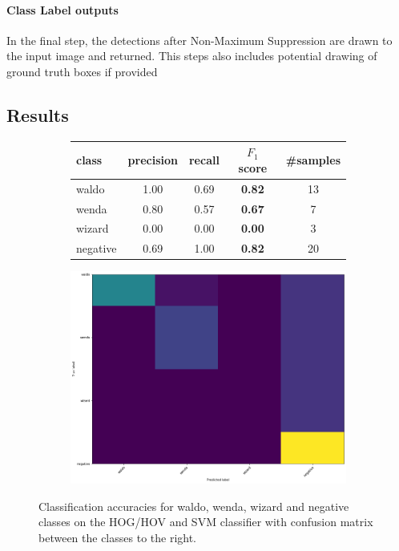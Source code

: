 \documentclass[11pt]{article}
\begin{document}
\paragraph{Class Label outputs}
In the final step, the detections after Non-Maximum Suppression are drawn to the input image and returned. 
This steps also includes potential drawing of ground truth boxes if provided

\subsection{Results}\label{subsec:results}

\begin{figure}[]
    \centering
    \begin{subfigure}{0.6\linewidth}
    \begin{tabular}{lcccc}
        \toprule
        class & precision & recall & \( F_1 \) score & \#samples \\
        \midrule
           waldo &  1.00 &  0.69 & \textbf{0.82} &  13 \\
           wenda &  0.80 &  0.57 & \textbf{0.67} &   7 \\
          wizard &  0.00 &  0.00 & \textbf{0.00} &   3 \\
        negative &  0.69 &  1.00 & \textbf{0.82} &  20 \\
        \bottomrule
    \end{tabular}
    \end{subfigure}
    \begin{subfigure}{0.35\linewidth}
    \includegraphics[width =\linewidth]{figures/confusion_matrix}
    \end{subfigure}

    \caption{Classification accuracies for waldo, wenda, wizard and negative classes on the HOG/HOV and SVM classifier
    with confusion matrix between the classes to the right.}
    \label{tab:classification_acc}
\end{figure}
\end{document}
